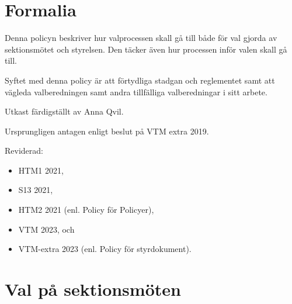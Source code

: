 \documentclass{dsekpolicy}
\begin{document}
\maketitle
\section{Formalia}
\begin{parasection}
  Denna policyn beskriver hur valprocessen skall gå till både för val gjorda av
  sektionsmötet och styrelsen. Den täcker även hur processen inför valen skall
  gå till.

  Syftet med denna policy är att förtydliga stadgan och reglementet samt att
  vägleda valberedningen samt andra tillfälliga valberedningar i sitt arbete.

  Utkast färdigställt av Anna Qvil.

  Ursprungligen antagen enligt beslut på VTM extra 2019.

  Reviderad:
  \begin{itemize}
    \item HTM1 2021,
    \item S13 2021,
    \item HTM2 2021 (enl. Policy för Policyer),
    \item VTM 2023, och
    \item VTM-extra 2023 (enl. Policy för styrdokument).
  \end{itemize}

\end{parasection}

\section{Val på sektionsmöten}
\end{document}
